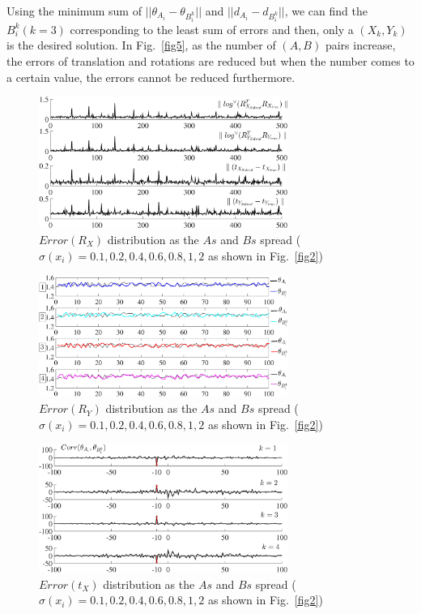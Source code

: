 \documentclass[letterpaper, 10 pt, conference]{ieeeconf}  %
\begin{document}
Using the minimum sum of $||\theta_{A_{i}} - \theta_{B_{i}^{k}}||$ and $||d_{A_{i}} - d_{B_{i}^{k}}||$, we can find the ${B_{i}^{k}}(k=3)$ corresponding to the least sum of errors and then, only a $(X_k,Y_k)$ is the desired solution. In Fig.~\ref{fig5}, as the number of $(A,B)$ pairs increase, the errors of translation and rotations are reduced but when the number comes to a certain value, the errors cannot be reduced furthermore.

\begin{center}
\begin{figure}
\centering
\includegraphics[width=3.2in]{fig6.eps}
\caption{
$Error(R_X)$ distribution as the $As$ and $Bs$ spread ($\sigma(x_i) = 0.1, 0.2, 0.4, 0.6, 0.8, 1, 2$ as shown in Fig.~\ref{fig2})
}
\label{fig6}
\end{figure}
\end{center}

\begin{center}
\begin{figure}
\centering
\includegraphics[width=3.2in]{fig7.eps}
\caption{
$Error(R_Y)$ distribution as the $As$ and $Bs$ spread ($\sigma(x_i) = 0.1, 0.2, 0.4, 0.6, 0.8, 1, 2$ as shown in Fig.~\ref{fig2})
}
\label{fig7}
\end{figure}
\end{center}

\begin{center}
\begin{figure}
\centering
\includegraphics[width=3.2in]{fig8.eps}
\caption{
$Error(t_X)$ distribution as the $As$ and $Bs$ spread ($\sigma(x_i) = 0.1, 0.2, 0.4, 0.6, 0.8, 1, 2$ as shown in Fig.~\ref{fig2})
}
\label{fig8}
\end{figure}
\end{center}
\end{document}
